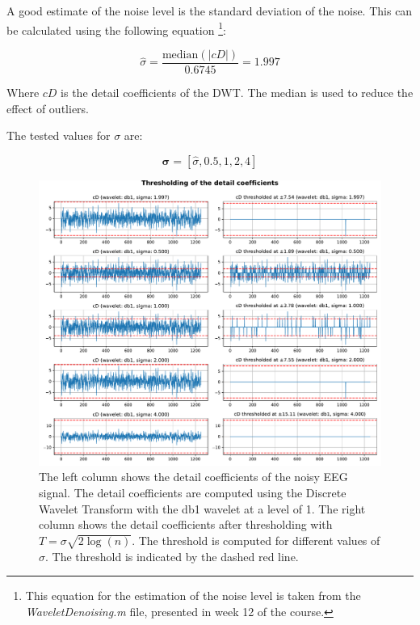 \vspace{0.5cm}

A good estimate of the noise level is the standard deviation of the noise. This can be calculated using the following equation
\footnote{This equation for the estimation of the noise level is taken from the \textit{WaveletDenoising.m} file, presented in week 12 of the course.}:

\begin{equation}
    \hat{\sigma} = \frac{\mathrm{median}(|cD|)}{0.6745} = 1.997
\end{equation}

Where $cD$ is the detail coefficients of the DWT. The median is used to reduce the effect of outliers.

The tested values for $\sigma$ are:

\begin{equation}
    \mathbf{\sigma} = [ \hat{\sigma}, 0.5, 1, 2, 4 ]
\end{equation}

\begin{figure}[H]
    \centering
    \includegraphics[width=\textwidth]{./img/problem3-thresholding-of-detail-coefficients.pdf}
    \caption{The left column shows the detail coefficients of the noisy EEG signal. The detail coefficients are computed using the Discrete Wavelet Transform with the \textrm{db1} wavelet at a level of 1. The right column shows the detail coefficients after thresholding with $T = \sigma \sqrt{2 \log(n)}$. The threshold is computed for different values of $\sigma$. The threshold is indicated by the dashed red line.}
    \label{fig:problem3thresholding}
\end{figure}

